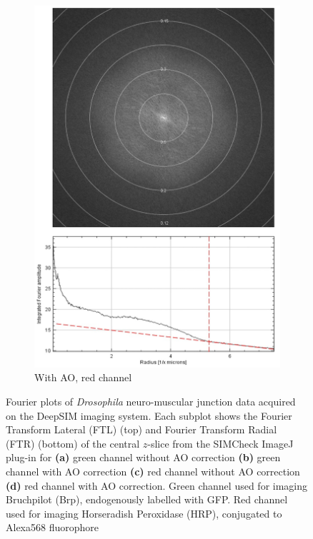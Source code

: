 \begin{figure}
\begin{subfigure}[t]{0.45\textwidth}
		\includegraphics[width=\linewidth]{images/DeepSIM_NMJ_AO_Alexa568_ft_and_plot.jpg}
		\caption{With AO, red channel}
		\label{fig:DeepSIM_NMJ_AO_Alexa568_ft_and_plot}
	\end{subfigure}
	\caption[Fourier plots of \textit{Drosophila} neuro-muscular junction 
	data acquired on the DeepSIM imaging system]{Fourier plots of 
		\textit{Drosophila} neuro-muscular junction data acquired on the 
		DeepSIM imaging system. Each subplot shows the Fourier Transform 
		Lateral (FTL) (top) and Fourier	Transform Radial (FTR) (bottom) of 
		the central $z$-slice from the SIMCheck ImageJ 
		plug-in\cite{ball2015simcheck} for \textbf{(a)} green channel without 
		AO correction \textbf{(b)} green channel with AO correction 
		\textbf{(c)} red channel without AO correction \textbf{(d)} red 
		channel with AO correction. Green channel used for imaging Bruchpilot 
		(Brp), endogenously labelled with GFP. Red channel used for imaging 
		Horseradish Peroxidase (HRP), conjugated to Alexa568 fluorophore}
	\label{fig:NMJ_ft_data}
\end{figure}
